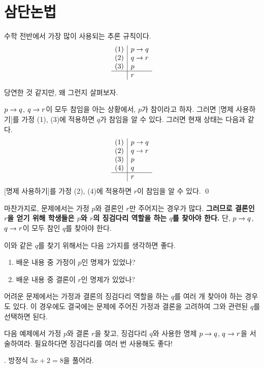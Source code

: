 \section{삼단논법}

수학 전반에서 가장 많이 사용되는 추론 규칙이다.
\[
    \begin{array}{c|l}
        (1) & p \rightarrow q \\ (2) & q \rightarrow r \\ (3) & p \\\hline & r
    \end{array}
\]

당연한 것 같지만, 왜 그런지 살펴보자.

\pf \(p \rightarrow q\), \(q \rightarrow r\)이 모두 참임을 아는 상황에서, \(p\)가 참이라고 하자. 그러면 [명제 사용하기]를 가정 (1), (3)에 적용하면 \(q\)가 참임을 알 수 있다. 그러면 현재 상태는 다음과 같다.
\[
    \begin{array}{c|l}
        (1) & p \rightarrow q \\ (2) & q \rightarrow r \\ (3) & p \\ (4) & q \\\hline & r
    \end{array}
\]
[명제 사용하기]를 가정 (2), (4)에 적용하면 \(r\)이 참임을 알 수 있다. \qed

마찬가지로, 문제에서는 가정 \(p\)와 결론인 \(r\)만 주어지는 경우가 많다. \textbf{그러므로 결론인 \(r\)을 얻기 위해 학생들은 \(p\)와 \(r\)의 징검다리 역할을 하는 \(q\)를 찾아야 한다.} 단, \(p \rightarrow q\), \(q \rightarrow r\)이 모두 참인 \(q\)를 찾아야 한다.

이와 같은 \(q\)를 찾기 위해서는 다음 2가지를 생각하면 좋다.
\begin{enumerate}
    \item 배운 내용 중 가정이 \(p\)인 명제가 있었나?
    \item 배운 내용 중 결론이 \(r\)인 명제가 있었나?
\end{enumerate}

어려운 문제에서는 가정과 결론의 징검다리 역할을 하는 \(q\)를 여러 개 찾아야 하는 경우도 있다. 이 경우에도 결국에는 문제에 주어진 가정과 결론을 고려하여 그와 관련된 \(q\)를 선택하면 된다.

\pagebreak

다음 예제에서 가정 \(p\)와 결론 \(r\)을 찾고, 징검다리 \(q\)와 사용한 명제 \(p \rightarrow q\), \(q \rightarrow r\)을 서술하여라. 필요하다면 징검다리를 여러 번 사용해도 좋다!

\ex. 방정식 \(3x + 2 = 8\)을 풀어라.

